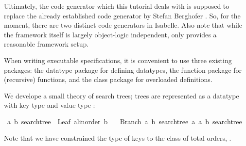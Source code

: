 \begin{isabellebody}
\begin{isamarkuptext}
  \begin{warn}
    Ultimately, the code generator which this tutorial deals with
    is supposed to replace the already established code generator
    by Stefan Berghofer \cite{Berghofer-Nipkow:2002}.
    So, for the moment, there are two distinct code generators
    in Isabelle.
    Also note that while the framework itself is largely
    object-logic independent, only  provides a reasonable
    framework setup.    
  \end{warn}%
\end{isamarkuptext}%
\isamarkuptrue%
%
\isamarkuptrue%
%
\begin{isamarkuptext}%
When writing executable specifications, it is convenient to use
  three existing packages: the datatype package for defining
  datatypes, the function package for (recursive) functions,
  and the class package for overloaded definitions.

  We develope a small theory of search trees; trees are represented
  as a datatype with key type  and value type :%
\end{isamarkuptext}%
\isamarkuptrue%
\isamarkupfalse%
\ {\isacharparenleft}{\isacharprime}a{\isacharcomma}\ {\isacharprime}b{\isacharparenright}\ searchtree\ {\isacharequal}\ Leaf\ {\isachardoublequoteopen}{\isacharprime}a{\isasymColon}linorder{\isachardoublequoteclose}\ {\isacharprime}b\isanewline
\ \ {\isacharbar}\ Branch\ {\isachardoublequoteopen}{\isacharparenleft}{\isacharprime}a{\isacharcomma}\ {\isacharprime}b{\isacharparenright}\ searchtree{\isachardoublequoteclose}\ {\isachardoublequoteopen}{\isacharprime}a{\isachardoublequoteclose}\ {\isachardoublequoteopen}{\isacharparenleft}{\isacharprime}a{\isacharcomma}\ {\isacharprime}b{\isacharparenright}\ searchtree{\isachardoublequoteclose}%
\begin{isamarkuptext}%
\noindent Note that we have constrained the type of keys
  to the class of total orders, .


\end{isamarkuptext}
\end{isabellebody}
